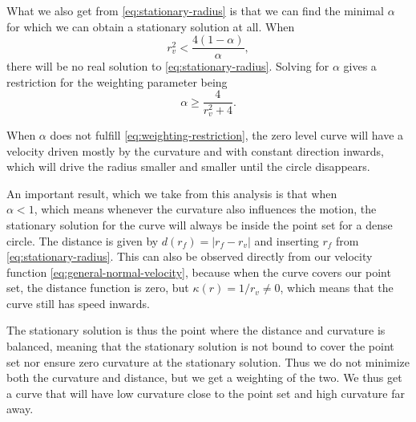 What we also get from \eqref{eq:stationary-radius} is that we can find the minimal $\alpha$ for which we can obtain a stationary solution at all. When 
\begin{equation*}
    r_v^2 < \frac{4(1-\alpha)}{\alpha},
\end{equation*}
there will be no real solution to \eqref{eq:stationary-radius}. Solving for $\alpha$ gives a restriction for the weighting parameter being
\begin{equation}
    \alpha \geq \frac{4}{r_v^2 + 4}.
    \label{eq:weighting-restriction}
\end{equation}

When $\alpha$ does not fulfill \eqref{eq:weighting-restriction}, the zero level curve will have a velocity driven mostly by the curvature and with constant direction inwards, which will drive the radius smaller and smaller until the circle disappears.

An important result, which we take from this analysis is that when \\ $\alpha<1$, which means whenever the curvature also influences the motion, the stationary solution for the curve will always be inside the point set for a dense circle. The distance is given by $d(r_f) = |r_f-r_v|$ and inserting $r_f$ from \eqref{eq:stationary-radius}. This can also be observed directly from our velocity function \eqref{eq:general-normal-velocity}, because when the curve covers our point set, the distance function is zero, but $\kappa(r) = 1/r_v\neq 0$, which means that the curve still has speed inwards. 

The stationary solution is thus the point where the distance and curvature is balanced, meaning that the stationary solution is not bound to cover the point set nor ensure zero curvature at the stationary solution. Thus we do not minimize both the curvature and distance, but we get a weighting of the two. We thus get a curve that will have low curvature close to the point set and high curvature far away.





